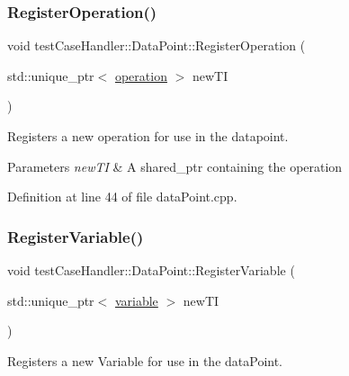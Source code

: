 \mbox{\label{classtestCaseHandler_1_1DataPoint_affedda74a9c4cfc4ddc4aaab8cb92c05}} 
\subsubsection{\texorpdfstring{RegisterOperation()}{RegisterOperation()}}
{\footnotesize\ttfamily void test\+Case\+Handler\+::\+Data\+Point\+::\+Register\+Operation (\begin{DoxyParamCaption}\item[{std\+::unique\+\_\+ptr$<$ \mbox{\hyperlink{classtestCaseHandler_1_1operation}{operation}} $>$}]{new\+TI }\end{DoxyParamCaption})}



Registers a new operation for use in the datapoint. 


\begin{DoxyParams}{Parameters}
{\em new\+TI} & A shared\+\_\+ptr containing the operation \\
\hline
\end{DoxyParams}


Definition at line 44 of file data\+Point.\+cpp.

\mbox{\label{classtestCaseHandler_1_1DataPoint_a9eac56ca6d3b6054688444f3f7a416a5}} 
\subsubsection{\texorpdfstring{RegisterVariable()}{RegisterVariable()}}
{\footnotesize\ttfamily void test\+Case\+Handler\+::\+Data\+Point\+::\+Register\+Variable (\begin{DoxyParamCaption}\item[{std\+::unique\+\_\+ptr$<$ \mbox{\hyperlink{classtestCaseHandler_1_1variable}{variable}} $>$}]{new\+TI }\end{DoxyParamCaption})}



Registers a new Variable for use in the data\+Point. 



